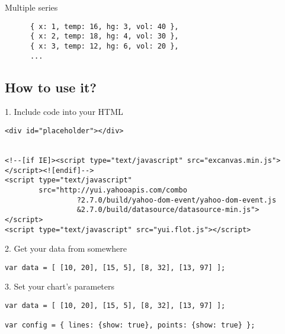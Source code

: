 \documentclass{beamer}
\begin{document}
\begin{frame}[fragile]{Multiple series}
  \begin{block}{}
    \begin{verbatim}
      { x: 1, temp: 16, hg: 3, vol: 40 },
      { x: 2, temp: 18, hg: 4, vol: 30 },
      { x: 3, temp: 12, hg: 6, vol: 20 },
      ...
    \end{verbatim}
  \end{block}
\end{frame}

\subsection{How to use it?}
\begin{frame}[fragile]{1. Include code into your HTML}
\begin{block}{}
\tiny{\begin{verbatim}
<div id="placeholder"></div>


<!--[if IE]><script type="text/javascript" src="excanvas.min.js"></script><![endif]-->
<script type="text/javascript"
        src="http://yui.yahooapis.com/combo
                 ?2.7.0/build/yahoo-dom-event/yahoo-dom-event.js
                 &2.7.0/build/datasource/datasource-min.js">
</script>
<script type="text/javascript" src="yui.flot.js"></script>
\end{verbatim}}
\end{block}
\end{frame}

\begin{frame}[fragile]{2. Get your data from somewhere}
\begin{block}{}
\tiny{\begin{verbatim}
var data = [ [10, 20], [15, 5], [8, 32], [13, 97] ];
\end{verbatim}}
\end{block}
\end{frame}

\begin{frame}[fragile]{3. Set your chart's parameters}
\begin{block}{}
\tiny{\begin{verbatim}
var data = [ [10, 20], [15, 5], [8, 32], [13, 97] ];

var config = { lines: {show: true}, points: {show: true} };
\end{verbatim}}
\end{block}
\end{frame}
\end{document}
